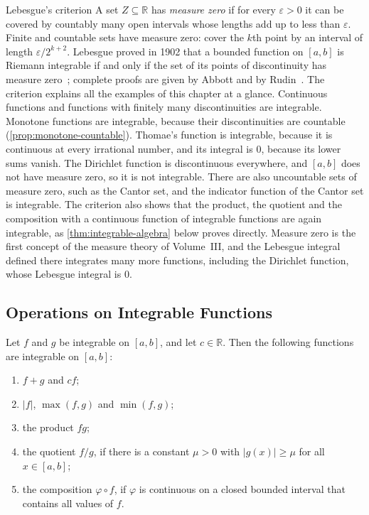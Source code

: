 \begin{note}{Lebesgue's criterion}
A set $Z\subseteq\mathbb R$ has \emph{measure zero} if for every $\varepsilon>0$ it can be covered by countably many open intervals whose lengths add up to less than $\varepsilon$. Finite and countable sets have measure zero: cover the $k$th point by an interval of length $\varepsilon/2^{k+2}$. Lebesgue proved in 1902 that a bounded function on $[a,b]$ is Riemann integrable if and only if the set of its points of discontinuity has measure zero~\cite{lebesgue1902}; complete proofs are given by Abbott and by Rudin~\cite{abbott2015,rudin1976}. The criterion explains all the examples of this chapter at a glance. Continuous functions and functions with finitely many discontinuities are integrable. Monotone functions are integrable, because their discontinuities are countable (\cref{prop:monotone-countable}). Thomae's function is integrable, because it is continuous at every irrational number, and its integral is $0$, because its lower sums vanish. The Dirichlet function is discontinuous everywhere, and $[a,b]$ does not have measure zero, so it is not integrable. There are also uncountable sets of measure zero, such as the Cantor set, and the indicator function of the Cantor set is integrable. The criterion also shows that the product, the quotient and the composition with a continuous function of integrable functions are again integrable, as \cref{thm:integrable-algebra} below proves directly. Measure zero is the first concept of the measure theory of Volume~III, and the Lebesgue integral defined there integrates many more functions, including the Dirichlet function, whose Lebesgue integral is $0$.
\end{note}

\subsection{Operations on Integrable Functions}

\begin{theorem}
\label{thm:integrable-algebra}
Let $f$ and $g$ be integrable on $[a,b]$, and let $c\in\mathbb R$. Then the following functions are integrable on $[a,b]$:
\begin{enumerate}
\item $f+g$ and $cf$;
\item $|f|$, $\max(f,g)$ and $\min(f,g)$;
\item the product $fg$;
\item the quotient $f/g$, if there is a constant $\mu>0$ with $|g(x)|\ge\mu$ for all $x\in[a,b]$;
\item the composition $\varphi\circ f$, if $\varphi$ is continuous on a closed bounded interval that contains all values of $f$.
\end{enumerate}
\end{theorem}

